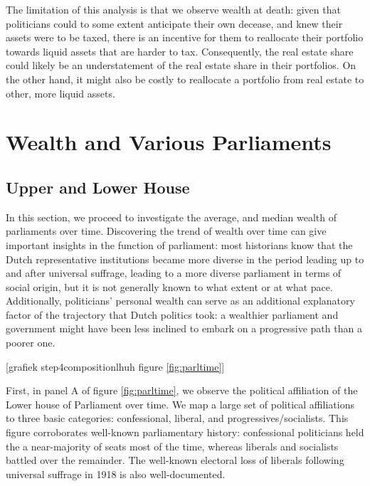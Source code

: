     The limitation of this analysis is that we observe wealth at death: given that politicians could to some extent anticipate their own decease, and knew their assets were to be taxed, there is an incentive for them to reallocate their portfolio towards liquid assets that are harder to tax. Consequently, the real estate share could likely be an understatement of the real estate share in their portfolios. On the other hand, it might also be costly to reallocate a portfolio from real estate to other, more liquid assets. 

\section{Wealth and Various Parliaments}

\subsection{Upper and Lower House}
    In this section, we proceed to investigate the average, and median wealth of parliaments over time. Discovering the trend of wealth over time can give important insights in the function of parliament: most historians know that the Dutch representative institutions became more diverse in the period leading up to and after universal suffrage, leading to a more diverse parliament in terms of social origin, but it is not generally known to what extent or at what pace. Additionally, politicians' personal wealth can serve as an additional explanatory factor of the trajectory that Dutch politics took: a wealthier parliament and government might have been less inclined to embark on a progressive path than a poorer one. 
    
\begin{center}
    [grafiek step4compositionlhuh figure \ref{fig:parltime}]
\end{center}

    First, in panel A of figure \ref{fig:parltime}, we observe the political affiliation of the Lower house of Parliament over time. We map a large set of political affiliations to three basic categories: confessional, liberal, and progressives/socialists. %
    This figure corroborates well-known parliamentary history: confessional politicians held the a near-majority of seats most of the time, whereas liberals and socialists battled over the remainder. The well-known electoral loss of liberals following universal suffrage in 1918 is also well-documented. \autocite{van2018tussen} 
    
